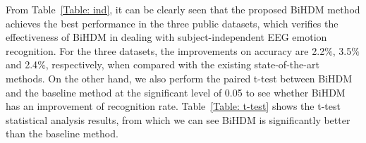 \documentclass[journal]{IEEEtran}
\begin{document}
From Table~\ref{Table: ind}, it can be clearly seen that the proposed BiHDM method achieves the best performance in the three public datasets, which verifies the effectiveness of BiHDM in dealing with subject-independent EEG emotion recognition. For the three datasets, the improvements on accuracy are 2.2$\%$, 3.5$\%$ and 2.4$\%$, respectively, when compared with the existing state-of-the-art methods. On the other hand, we also perform the paired t-test between BiHDM and the baseline method at the significant level of 0.05 to see whether BiHDM has an improvement of recognition rate. Table~\ref{Table: t-test} shows the t-test statistical analysis results, from which we can see BiHDM is significantly better than the baseline method.
\end{document}
